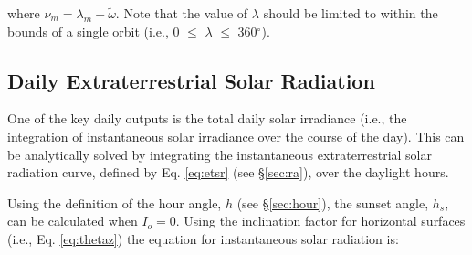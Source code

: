 \noindent where $\nu_m = \lambda_m - \tilde{\omega}$. 
Note that the value of $\lambda$ should be limited to within the bounds of a single orbit (i.e., 0 $\leq$ $\lambda$ $\leq$ 360$^{\circ}$).

\subsection{Daily Extraterrestrial Solar Radiation}
\label{sec:dra}
One of the key daily outputs is the total daily solar irradiance (i.e., the integration of instantaneous solar irradiance over the course of the day). 
This can be analytically solved by integrating the instantaneous extraterrestrial solar radiation curve, defined by Eq. \ref{eq:etsr} (see \S \ref{sec:ra}), over the daylight hours. 

Using the definition of the hour angle, $h$ (see \S \ref{sec:hour}), the sunset angle, $h_s$, can be calculated when $I_o = 0$. 
Using the inclination factor for horizontal surfaces (i.e., Eq. \ref{eq:thetaz}) the equation for instantaneous solar radiation is:

